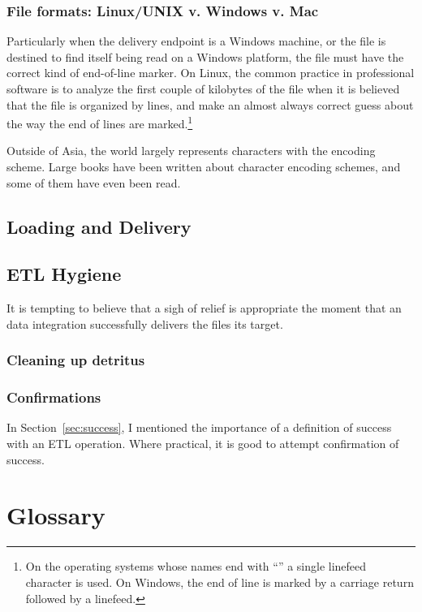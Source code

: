 \documentclass[11pt,letterpaper,twosided]{memoir}
\begin{document}
\subsection{File formats: Linux/UNIX v. Windows v. Mac}

Particularly when the delivery endpoint is a Windows machine, or
the file is destined to find itself being read on a Windows platform,
the file must have the correct kind of end-of-line marker. On Linux,
the common practice in professional software is to analyze the first
couple of kilobytes of the file when it is believed that the file
is organized by lines, and make an almost always correct guess about
the way the end of lines are marked.\footnote{On the operating
systems whose names end with ``'' a single linefeed character
is used. On Windows, the end of line is marked by a carriage return
followed by a linefeed.}

Outside of Asia, the world largely represents characters with 
the  encoding scheme. Large books have been written
about character encoding schemes, and some of them have even been
read. 

\section{Loading and Delivery}

\section{ETL Hygiene}

It is tempting to believe that a sigh of relief is appropriate the
moment that an data integration successfully delivers the files its
target. 

\subsection{Cleaning up detritus}


\subsection{Confirmations}

In Section~\ref{sec:success}, I mentioned the importance of a 
definition of success with an ETL operation. Where practical, it is 
good to attempt confirmation of success. 


\appendix
\chapter{Glossary}
\end{document}
